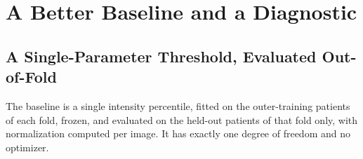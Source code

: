 %
%
%
\section{A Better Baseline and a Diagnostic}
\label{sec:baseline}

\subsection{A Single-Parameter Threshold, Evaluated Out-of-Fold}

The baseline is a single intensity percentile, fitted on the outer-training
patients of each fold, frozen, and evaluated on the held-out patients of that
fold only, with normalization computed per image. It has exactly one degree of
freedom and no optimizer.

